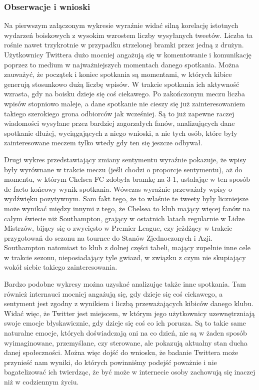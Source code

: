 \subsubsection{Obserwacje i wnioski}
Na pierwszym załączonym wykresie wyraźnie widać silną korelację istotnych
wydarzeń boiskowych z wysokim wzrostem liczby wysyłanych tweetów. 
Liczba ta rośnie nawet trzykrotnie w przypadku strzelonej bramki przez jedną
z drużyn. Użytkownicy Twittera dużo mocniej angażują się w komentowanie i 
komunikację poprzez to medium w najważniejszych momentach danego spotkania.
Można zauważyć, że początek i koniec spotkania są momentami, w których
kibice generują stosunkowo dużą liczbę wpisów. W trakcie spotkania
ich aktywność wzrasta, gdy na boisku dzieje się coś ciekawego.
Po zakończonym meczu liczba wpisów stopniowo maleje, a dane spotkanie
nie cieszy się już zainteresowaniem takiego szerokiego grona
odbiorców jak wcześniej. Są to już zapewne raczej wiadomości wysyłane
przez bardziej zagorzałych fanów, analizujących dane spotkanie dłużej,
wyciągających z niego wnioski, a nie tych osób, które były zainteresowane
meczem tylko wtedy gdy ten się jeszcze odbywał.

Drugi wykres przedstawiający zmiany sentymentu wyraźnie pokazuje, że wpisy były
wyrównane w trakcie meczu (jeśli chodzi o proporcje sentymentu), aż do momentu,
w którym Chelsea FC zdobyła bramkę na 3-1, ustalając w ten sposób de facto
końcowy wynik spotkania. Wówczas wyraźnie przeważały wpisy o wydźwięku
pozytywnym. Sam fakt tego, że to właśnie te tweety były liczniejsze może wynikać
między innymi z tego, że Chelsea to klub mający więcej fanów na całym świecie
niż Southampton, grający w ostatnich latach regularnie w Lidze Mistrzów, bijący
się o zwycięsto w Premier League, czy jeżdżący w trakcie przygotowań do sezonu
na tournee do Stanów Zjednoczonych i Azji. Southampton natomiast to klub z dolnej
części tabeli, mający zupełnie inne cele w trakcie sezonu, nieposiadający tyle
gwiazd, w związku z czym nie skupiający wokół siebie takiego zainteresowania.

Bardzo podobne wykresy można uzyskać analizując także inne spotkania.
Tam również internauci mocniej angażują się, gdy dzieje się coś ciekawego, a
sentyment jest zgodny z wynikiem i liczbą przeważających kibiców danego klubu.
Widać więc, że Twitter jest miejscem, w którym jego użytkownicy uzewnętrzniają
swoje emocje błyskawicznie, gdy dzieje się coś co ich porusza.
Są to takie same naturalne emocje, których doświadczają oni na co dzień, nie są
w żaden sposób wyimaginowane, przemyślane, czy sterowane, ale pokazują aktualny
stan ducha danej społeczności. Można więc dojść do wniosku, że badanie Twittera
może przynieść nam wyniki, do których powinniśmy podejść poważnie i nie
bagatelizować ich twierdząc, że być może w internecie osoby zachowują się
inaczej niż w codziennym życiu.




